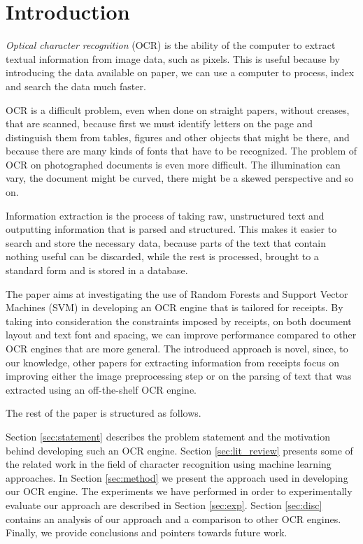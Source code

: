 \section{Introduction}
\textit{Optical character recognition} (OCR) is the ability of the computer to extract textual information from image data, such as pixels\cite{schantz1982history}. This is useful because by introducing the data available on paper, we can use a computer to process, index and search the data much faster.  

OCR is a difficult problem, even when done on straight papers, without creases, that are scanned, because first we must identify letters on the page and distinguish them from tables, figures and other objects that might be there, and because there are many kinds of fonts that have to be recognized. The problem of OCR on photographed documents is even more difficult. The illumination can vary, the document might be curved, there might be a skewed perspective and so on. 

Information extraction is the process of taking raw, unstructured text and outputting information that is parsed and structured. This makes it easier to search and store the necessary data, because parts of the text that contain nothing useful can be discarded, while the rest is processed, brought to a standard form and is stored in a database. 

The paper aims at investigating the use of Random Forests\cite{breiman2001random} and Support Vector Machines (SVM)\cite{Cortes_1995} in developing an OCR engine that is tailored for receipts. By taking into consideration the constraints imposed by receipts, on both document layout and text font and spacing, we can improve performance compared to other OCR engines that are more general. The introduced approach is novel, since, to our knowledge, other papers for extracting information from receipts focus on improving either the image preprocessing step or on the parsing of text that was extracted using an off-the-shelf OCR engine.

The rest of the paper is structured as follows.

Section \ref{sec:statement} describes the problem statement and the motivation behind developing such an OCR engine. Section \ref{sec:lit_review} presents some of the related work in the field of character recognition using machine learning approaches. In Section \ref{sec:method} we present the approach used in developing our OCR engine. The experiments we have performed in order to experimentally evaluate our approach are described in Section \ref{sec:exp}. Section \ref{sec:disc} contains an analysis of our approach and a comparison to other OCR engines. Finally, we provide conclusions and pointers towards future work. 
